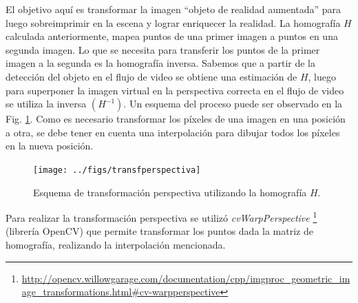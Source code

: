 El objetivo aquí es transformar la imagen ``objeto de realidad aumentada'' para luego sobreimprimir en la escena y lograr enriquecer la realidad. La homografía $H$ calculada anteriormente, mapea puntos de una primer imagen a puntos en una segunda imagen. Lo que se necesita para transferir los puntos de la primer imagen a la segunda es la homografía inversa. Sabemos que a partir de la detección del objeto en el flujo de video se obtiene una estimación de $H$, luego para superponer la imagen virtual en la perspectiva correcta en el flujo de video  se utiliza la inversa $(H^{-1})$. Un esquema del proceso puede ser observado en la Fig. \ref{fig:transf_pespectiva}. Como es necesario transformar los píxeles de una imagen en una posición a otra, se debe tener en cuenta una interpolación para dibujar todos los píxeles en la nueva posición.
\begin{figure}[tbhp]
   \centering
        \texttt{[image: ../figs/transfperspectiva]}
    \caption[Esquema de transformación perspectiva]{Esquema de transformación perspectiva utilizando la homografía $H$.}
   \label{fig:transf_pespectiva}
\end{figure}
Para realizar la transformación perspectiva se utilizó \textit{cvWarpPerspective} \footnote{\url{http://opencv.willowgarage.com/documentation/cpp/imgproc_geometric_image_transformations.html\#cv-warpperspective}} (librería OpenCV) que permite transformar los puntos dada la matriz de homografía, realizando la interpolación mencionada.
